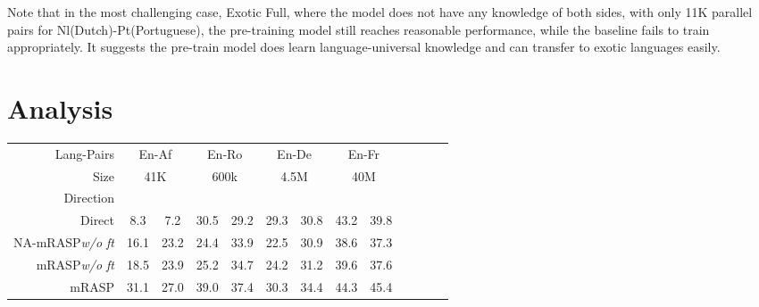 \documentclass[11pt,a4paper]{article}
\newcommand{\mf}[1]{\multicolumn{2}{c}{ #1}}
\newcommand{\smf}[1]{\multicolumn{2}{c}{#1}}
\newcommand{\method}{mRASP\xspace}
\newcommand{\baseline}{Direct}
\begin{document}
Note that in the most challenging case, Exotic Full, where the model does not have any knowledge of both sides, with only 11K parallel pairs for Nl(Dutch)-Pt(Portuguese), the pre-training model still reaches reasonable performance, while the baseline fails to train appropriately. It suggests the pre-train model does learn language-universal knowledge and can transfer to exotic languages easily.
 
\section{Analysis}
\label{sec: analysis}


\begin{table*}[ht]
\centering
\begin{tabular}{rcccccccccccc}
\toprule


Lang-Pairs& 
\mf{En-Af} &
\mf{En-Ro} &
\mf{En-De} &
\mf{En-Fr} & 

\\



Size &
\smf{41K}  & 
\smf{600k}  & 
\smf{4.5M} & 
\smf{40M} & 

\\


 Direction & 
  & &

  & &

  & &

  & \\




\midrule
\baseline &
8.3 & 7.2 & 30.5 & 29.2 &  29.3 & 30.8 & 43.2 & 39.8 

\\

 NA-\method \textit{w/o ft} &
 16.1 &  23.2 &
 24.4 &  33.9 &
22.5 &  30.9 &
 38.6 & 37.3

\\

\midrule

 \method \textit{w/o ft} &
 18.5 &  23.9 &
 25.2 &  34.7 &
 24.2 &  31.2 &
 39.6 & 37.6

\\

 \method &
 31.1 &  27.0 &
  39.0 & 37.4 &
 30.3 &  34.4 &
 44.3 & 45.4  

\\




\bottomrule
\end{tabular}
\caption{
MT performance of \method with and without the RAS technique and fine-tuning strategy. 
\method includes both the RAS technique and fine-tuning strategy. We report tokenized BLEU for this experiment.
``\textit{w/o ft}'' denotes ``without fine-tuning''. 
We also report \method without fine-tuning and RAS to compare with \method without fine-tuning. 
Both RAS and fine-tuning proves effective and essential for \method. 
} 
\label{tab:No-tune-Compare}
\end{table*} 
\end{document}
